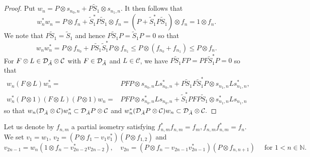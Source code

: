 \documentclass[11pt]{article}
\theoremstyle{plain}
\theoremstyle{definition}
\numberwithin{equation}{section}
\newcommand{\N}{\mathbb{N}}
\begin{document}
\begin{proof}
Put
$w_n = P \otimes s_{n_0,n} + P \tilde{S}_1\otimes s_{n_1,n}$.
It then follows that
\begin{equation*}
w_n^* w_n 
=P \otimes f_n + \tilde{S}_1^*P \tilde{S}_1\otimes f_n
=(P+ \tilde{S}_1^*P \tilde{S}_1)\otimes f_n
= 1 \otimes f_n.
\end{equation*}
We note that 
$P \tilde{S}_1 = \tilde{S}_1$ 
and hence
$P \tilde{S}_1 P  = \tilde{S}_1 P =0$ 
 so that  
\begin{equation*}
w_n w_n^*  
 =P \otimes f_{n_0} +  P \tilde{S}_1\tilde{S}_1^* P\otimes f_{n_1} 
\le P \otimes (f_{n_0} + f_{n_1}) \le P\otimes f_n.
\end{equation*}
For $F \otimes L \in {{\mathcal{D}}_{\tilde{A}}\otimes{\mathcal{C}}}$ with $F \in {{\mathcal{D}}_{\tilde{A}}}$ and $L \in {\mathcal{C}}$,
we have $P \tilde{S}_1 F P  = P F\tilde{S}_1^* P =0$ 
so that 
\begin{align*}
 w_n(F\otimes L)w_n^* 
=&  P F P \otimes s_{n_0,n} L s_{n_0,n}^*  
+ P \tilde{S}_1 F \tilde{S}_1^* P \otimes s_{n_1,n} L s_{n_1,n}^*, \\
w_n^*(P\otimes 1)(F\otimes L)(P\otimes 1)w_n
= & P F P \otimes  s_{n_0,n}^* L s_{n_0,n} 
+ \tilde{S}_1^* P F P \tilde{S}_1 \otimes s_{n_1,n}^*  L s_{n_1,n}
\end{align*}
so that 
$
 w_n({{\mathcal{D}}_{\tilde{A}}\otimes{\mathcal{C}}})w_n^* \subset {\mathcal{D}}_{\tilde{A}} P\otimes{\mathcal{C}}
$
and
$
w_n^*({\mathcal{D}}_{\tilde{A}} P\otimes{\mathcal{C}})w_n \subset
 {{\mathcal{D}}_{\tilde{A}}\otimes{\mathcal{C}}}.
$
\end{proof}
Let us denote by  $f_{n,m}$  a partial isometry satisfying 
$f_{n,m}^*f_{n,m}=f_m, f_{n,m}f_{n,m}^*=f_n.$
We set
$v_1 = w_1,\, v_{2} = (P\otimes f_1- v_{1} v_{1}^*)(P\otimes f_{1,2})$
and
\begin{equation*}
v_{2n-1} = w_n (1\otimes f_n- v_{2n-2}^* v_{2n-2}) , \quad
v_{2n} = (P\otimes f_n- v_{2n-1} v_{2n-1}^*)(P\otimes f_{n,n+1})
\quad \text{ for }
1< n \in \N.
\end{equation*}
\end{document}
